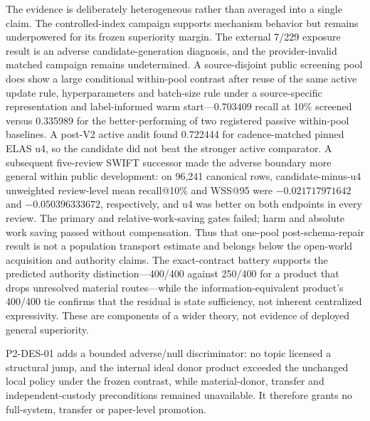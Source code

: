 \documentclass[11pt]{article}
\theoremstyle{definition}
\begin{document}
The evidence is deliberately heterogeneous rather than averaged into a single
claim.  The controlled-index campaign supports mechanism behavior but remains
underpowered for its frozen superiority margin.  The external 7/229 exposure
result is an adverse candidate-generation diagnosis, and the provider-invalid
matched campaign remains undetermined. A source-disjoint public screening pool
does show a large conditional within-pool contrast after reuse of the same
active update rule, hyperparameters and batch-size rule under a source-specific representation
and label-informed warm start---0.703409
recall at 10\% screened versus 0.335989 for the better-performing of two
registered passive within-pool baselines. A post-V2 active audit found 0.722444
for cadence-matched pinned ELAS u4, so the candidate did not beat the stronger
active comparator.  A subsequent five-review SWIFT successor made the adverse
boundary more general within public development: on 96,241 canonical rows,
candidate-minus-u4 unweighted review-level mean recall@10\% and WSS@95 were
$-0.021717971642$ and $-0.050396333672$, respectively, and u4 was better on
both endpoints in every review.  The primary and relative-work-saving gates
failed; harm and absolute work saving passed without compensation. Thus
that one-pool post-schema-repair result is not a population transport
estimate and belongs below the open-world acquisition
and authority claims.  The exact-contract battery supports the
predicted authority distinction---400/400 against 250/400 for a product that
drops unresolved material routes---while the information-equivalent product's
400/400 tie confirms that the residual is state sufficiency, not inherent
centralized expressivity.  These are components of a wider theory, not evidence
of deployed general superiority.

P2-DES-01 adds a bounded adverse/null discriminator: no topic licensed a
structural jump, and the internal ideal donor product exceeded the unchanged
local policy under the frozen contrast, while material-donor, transfer and
independent-custody preconditions remained unavailable.  It therefore grants no
full-system, transfer or paper-level promotion.
\end{document}
